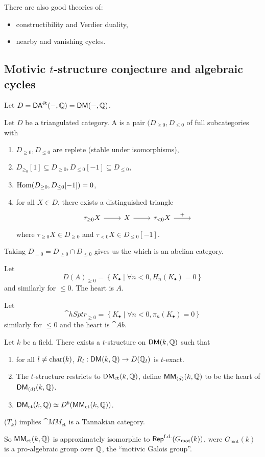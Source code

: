 There are also good theories of:
\begin{itemize}
\item constructibility and Verdier duality,
\item nearby and vanishing cycles.
\end{itemize}

\subsection{Motivic \texorpdfstring{$t$}{t}-structure conjecture and algebraic cycles}
Let $D = \mathsf{DA}^\text{\'et}(-,\mathbb Q) = \mathsf{DM}(-,\mathbb Q)$.
\begin{definition}
Let $D$ be a triangulated category. A  is a pair $(D_{\ge 0}, D_{\le
0}$ of full subcategories with
\begin{enumerate}[1)]
\item $D_{\ge 0}, D_{\le 0}$  are replete (stable under isomorphisms),
\item $D_{\ge_0}[1]\subseteq D_{\ge 0}, D_{\le 0}[-1]\subseteq D_{\le 0}$,
\item $\operatorname{Hom}(D_{\ge 0}, D_{\le 0}[-1]) = 0$,
\item for all $X\in D$, there exists a distinguished triangle
\[
\begin{tikzcd}
\tau_{\ge 0}X \ar[r] & X \ar[r] & \tau_{<0}X \ar[r,"+"] & {}
\end{tikzcd}
\]
where $\tau_{\ge 0}X\in D_{\ge 0}$ and $\tau_{<0}X\in D_{\le 0}[-1]$.
\end{enumerate}
Taking $D_{=0} = D_{\ge 0}\cap D_{\le 0}$ gives us the  which is an abelian category.
\end{definition}
\begin{example}
Let
\[
D(A)_{\ge 0} = \left\{ K_\bullet \middle| \forall n<0, H_n(K_\bullet)=0 \right\}
\]
and similarly for $\le 0$. The heart is $A$.
\end{example}
\begin{example}
Let
\[
\cat{hSptr}_{\ge 0} = \left\{ K_\bullet \middle| \forall n<0, \pi_n(K_\bullet)=0 \right\}
\]
similarly for $\le 0$ and the heart is $\cat{Ab}$.
\end{example}
\begin{conjecture}[$T_k$]
Let $k$ be a field. There exists a $t$-structure on $\mathsf{DM}(k,\mathbb Q)$ such that
\begin{enumerate}[1)]
\item for all $l\neq \operatorname{char}(k)$, $R_l:\cat{DM}(k,\Q)\to D(\Q_l)$ is $t$-exact.
\item The $t$-structure restricts to $\mathsf{DM}_{\text{ct}}(k,\mathbb Q)$, define
$\mathsf{MM}_{(d)}(k,\mathbb Q)$ to be the heart of $\mathsf{DM}_{(d)}(k,\mathbb Q)$.
\item $\mathsf{DM}_{\text{ct}}(k,\mathbb Q) \simeq D^{b}(\mathsf{MM}_{\text{ct}}(k,\mathbb Q))$.
\end{enumerate}
\end{conjecture}
\begin{lemma}
($T_k$) implies $\cat{MM}_{\text{ct}}$ is a Tannakian category.
\end{lemma}
So $\mathsf{MM}_{\text{ct}}(k,\mathbb Q)$ is approximately isomorphic to $\mathsf{Rep}^{\text{f.d.}}(G_\text{mot}(k))$,
were $G_{\text{mot}}(k)$ is a pro-algebraic group over $\mathbb Q$, the ``motivic Galois group''.

